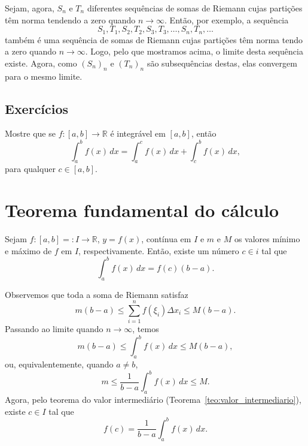 \begin{dem}
Sejam, agora, $S_n$ e $T_n$ diferentes sequências de somas de Riemann cujas partições têm norma tendendo a zero quando $n\to\infty$. Então, por exemplo, a sequência
\begin{equation}
  S_1, T_1, S_2, T_2, S_3, T_3, \dotsc, S_n, T_n, \ldots
\end{equation}
também é uma sequência de somas de Riemann cujas partições têm norma tendo a zero quando $n\to\infty$. Logo, pelo que mostramos acima, o limite desta sequência existe. Agora, como $(S_n)_n$ e $(T_n)_n$ são subsequências destas, elas convergem para o mesmo limite.
\end{dem}

\subsection*{Exercícios}

\begin{exer}
  Mostre que se $f:[a, b]\to\mathbb{R}$ é integrável em $[a, b]$, então
  \begin{equation}
    \int_a^b f(x)\,dx = \int_a^c f(x)\,dx + \int_c^b f(x)\,dx,
  \end{equation}
para qualquer $c\in [a, b]$.
\end{exer}

\section{Teorema fundamental do cálculo}

\begin{teo}\label{teo:da_media}
  Sejam $f:[a,b]=:I\to\mathbb{R}$, $y=f(x)$, contínua em $I$ e $m$ e $M$ os valores mínimo e máximo de $f$ em $I$, respectivamente. Então, existe um número $c\in i$ tal que
  \begin{equation}
    \int_a^b f(x)\,dx = f(c)(b-a).
  \end{equation}
\end{teo}
\begin{dem}
  Observemos que toda a soma de Riemann satisfaz
  \begin{equation}
    m(b-a) \leq \sum_{i=1}^n f(\xi_i)\Delta x_i \leq M(b-a).
  \end{equation}
Passando ao limite quando $n\to \infty$, temos
\begin{equation}
    m(b-a) \leq \int_a^b f(x)\,dx \leq M(b-a),
\end{equation}
ou, equivalentemente, quando $a\neq b$,
\begin{equation}
    m \leq \frac{1}{b-a}\int_a^b f(x)\,dx \leq M.
\end{equation}
Agora, pelo teorema do valor intermediário (Teorema~\ref{teo:valor_intermediario}), existe $c\in I$ tal que
\begin{equation}
  f(c) = \frac{1}{b-a}\int_a^b f(x)\,dx.
\end{equation}
\end{dem}

